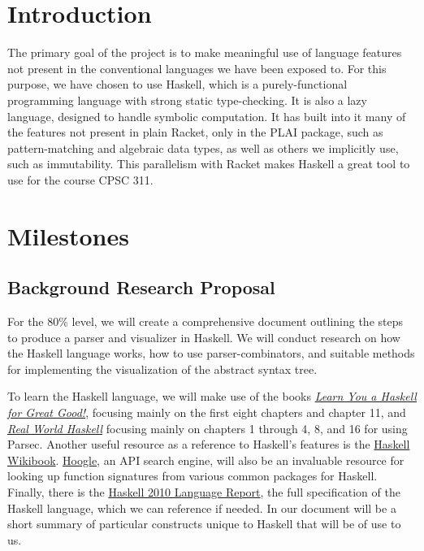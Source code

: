 \section{Introduction}
The primary goal of the project is to make meaningful use of language features not present in the conventional languages we have been exposed to. For this purpose, we have chosen to use Haskell, which is a purely-functional programming language with strong static type-checking.
It is also a lazy language, designed to handle symbolic computation. It has built into it many of the features not present in plain Racket, only in the PLAI package, such as pattern-matching and algebraic data types, as well as others we implicitly use, such as immutability. This parallelism with Racket makes Haskell a great tool to use for the course CPSC 311. 

\section{Milestones}

\subsection{Background Research Proposal}
For the 80\% level, we will create a comprehensive document outlining the steps to produce a parser and visualizer in Haskell. We will conduct research on how the Haskell language works, how to use parser-combinators, and suitable methods for implementing the visualization of the abstract syntax tree. 

To learn the Haskell language, we will make use of the books \textit{\href{http://learnyouahaskell.com/chapters}{Learn You a Haskell for Great Good!}}, focusing mainly on the first eight chapters and chapter 11, and \textit{\href{http://book.realworldhaskell.org/read/}{Real World Haskell}} focusing mainly on chapters 1 through 4, 8, and 16 for using Parsec. Another useful resource as a reference to Haskell's features is the \href{https://en.wikibooks.org/wiki/Haskell}{Haskell Wikibook}. \href{https://www.haskell.org/hoogle/}{Hoogle}, an API search engine, will also be an invaluable resource for looking up function signatures from various common packages for Haskell. Finally, there is the \href{https://www.haskell.org/onlinereport/haskell2010/}{Haskell 2010 Language Report}, the full specification of the Haskell language, which we can reference if needed. In our document will be a short summary of particular constructs unique to Haskell that will be of use to us.

